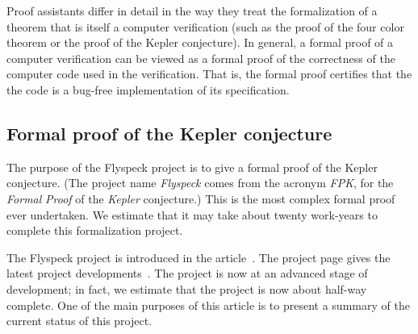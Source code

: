 \documentclass[11pt]{amsart}
\begin{document}
Proof assistants differ in detail in the way they treat the formalization
of  a theorem that is itself a computer verification (such as
the proof of the four color theorem or the proof of the Kepler conjecture).
In general, a formal proof of a computer verification can be viewed
as a formal proof of the correctness of the computer code used in the
verification.  That is, the formal proof certifies that the the code
is a bug-free implementation of its specification.





\subsection*{Formal proof of the Kepler conjecture}

The purpose of the Flyspeck project is to give a formal proof of the Kepler conjecture.  (The project name {\it Flyspeck} comes from the acronym {\it FPK}, for the {\it Formal} {\it Proof} of the {\it Kepler} conjecture.)  This is the most complex formal proof ever undertaken.  We estimate that it may take about twenty work-years to complete this formalization project.  

The Flyspeck project is introduced in the article~\cite{hales:DSP:2006:432}.
The project page gives the latest project developments~\cite{website:FlyspeckProject}.
The project is now at an advanced stage of development; in fact, we estimate that the project is now about half-way complete.  
One of the main purposes of this article is to present a summary of the current status of this project.
\end{document}
